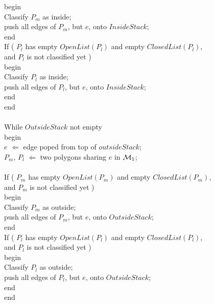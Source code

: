 \begin{bf}
\begin{tt}
\begin{tabbing}
\> \> begin \\
\> \> \> Classify $P_m$ as inside; \\
\> \> \> push all edges of $P_m$, but $e$, onto $InsideStack$; \\
\> \> end \\
\> \> If ( $P_l$ has empty $OpenList( P_l )$ and empty $ClosedList( P_l )$, \\
\> \> \mbox{\hspace{3in}} and $P_l$ is not classified yet ) \\
\> \> begin \\
\> \> \> Classify $P_l$ as inside; \\
\> \> \> push all edges of $P_l$, but $e$, onto $InsideStack$; \\
\> \> end \\
\> end \\
\\
\> While $OutsideStack$ not empty\\
\> begin \\
\> \> $e$ $\Leftarrow$ edge poped from top of $outsideStack$; \\
\> \> $P_m$, $P_l$ $\Leftarrow$ two polygons sharing $e$ in ${\cal M}_1$; \\
\\
\> \> If ( $P_m$ has empty $OpenList( P_m )$ and empty $ClosedList( P_m )$, \\
\> \> \mbox{\hspace{3in}} and $P_m$ is not classified yet ) \\
\> \> begin \\
\> \> \> Classify $P_m$ as outside; \\
\> \> \> push all edges of $P_m$, but $e$, onto $OutsideStack$; \\
\> \> end \\
\> \> If ( $P_l$ has empty $OpenList( P_l )$ and empty $ClosedList( P_l )$, \\
\> \> \mbox{\hspace{3in}} and $P_l$ is not classified yet ) \\
\> \> begin \\
\> \> \> Classify $P_l$ as outside; \\
\> \> \> push all edges of $P_l$, but $e$, onto $OutsideStack$; \\
\> \> end \\
\> end \\
\end{tabbing}
\end{tt}
\end{bf}

